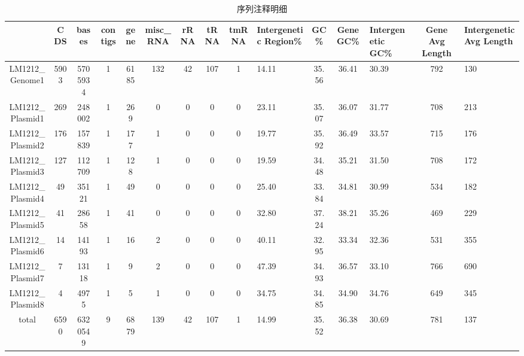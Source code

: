 \begin{sidewaystable}

		\centering
	\small
	\setlength\tabcolsep{1pt}

    \caption{序列注释明细}
    
       \begin{tabularx}{\textwidth}{cccccccccXccXcX}
\hline
&CDS&bases&contigs&gene&misc\_RNA&rRNA&tRNA&tmRNA&Intergenetic Region\%&GC\%&Gene GC\%&Intergenetic GC\%&Gene Avg Length&Intergenetic Avg Length\\
 \hline
LM1212\_Genome1&5903&5705934&1&6185&132&42&107&1&14.11&35.56&36.41&30.39&792&130\\
LM1212\_Plasmid1&269&248002&1&269&0&0&0&0&23.11&35.07&36.07&31.77&708&213\\
LM1212\_Plasmid2&176&157839&1&177&1&0&0&0&19.77&35.92&36.49&33.57&715&176\\
LM1212\_Plasmid3&127&112709&1&128&1&0&0&0&19.59&34.48&35.21&31.50&708&172\\
LM1212\_Plasmid4&49&35121&1&49&0&0&0&0&25.40&33.84&34.81&30.99&534&182\\
LM1212\_Plasmid5&41&28658&1&41&0&0&0&0&32.80&37.24&38.21&35.26&469&229\\
LM1212\_Plasmid6&14&14193&1&16&2&0&0&0&40.11&32.95&33.34&32.36&531&355\\
LM1212\_Plasmid7&7&13118&1&9&2&0&0&0&47.39&34.93&36.57&33.10&766&690\\
LM1212\_Plasmid8&4&4975&1&5&1&0&0&0&34.75&34.85&34.90&34.76&649&345\\
total&6590&6320549&9&6879&139&42&107&1&14.99&35.52&36.38&30.69&781&137\\
\hline
\end{tabularx}
\end{sidewaystable}
